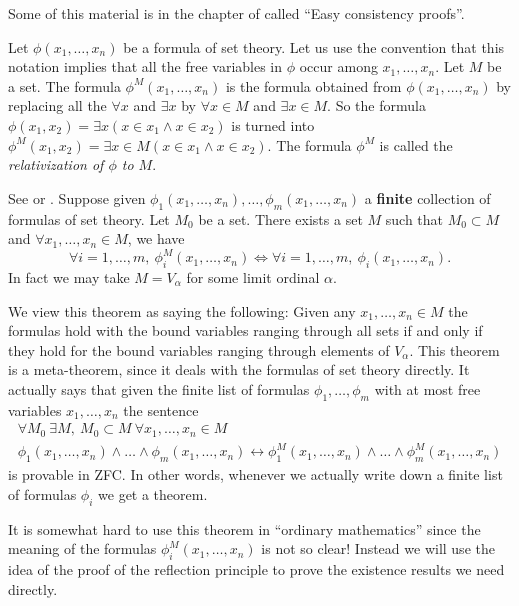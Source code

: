 \noindent
Some of this material is in the chapter of \cite{Kunen} called
``Easy consistency proofs''.

\medskip\noindent
Let $\phi(x_1,\ldots,x_n)$ be a formula of set theory.
Let us use the convention that this notation implies that
all the free variables in $\phi$ occur among $x_1, \ldots, x_n$.
Let $M$ be a set.
The formula $\phi^M(x_1, \ldots, x_n)$ is the
formula obtained from $\phi(x_1, \ldots, x_n)$ by replacing all the
$\forall x$ and $\exists x$ by $\forall x\in M$ and $\exists x\in M$.
So the formula
$\phi(x_1,x_2) = \exists x (x\in x_1 \wedge x\in x_2)$
is turned  into
$\phi^M(x_1,x_2) = \exists x \in M (x\in x_1 \wedge x\in x_2)$.
The formula $\phi^M$ is called the {\it relativization of $\phi$
to $M$}.

\begin{theorem}
\label{theorem-reflection-principle}
See \cite[Theorem 12.14]{Jech} or \cite[Theorem 7.4]{Kunen}.
Suppose given $\phi_1(x_1, \ldots, x_n), \ldots, \phi_m(x_1, \ldots, x_n)$
a {\bf finite} collection of
formulas of set theory. Let $M_0$ be a set.
There exists a set $M$ such that
$M_0 \subset M$ and
$\forall x_1, \ldots, x_n \in M$, we have
$$
\forall i = 1, \ldots, m,\  
\phi_i^{M}(x_1,\ldots,x_n)
\Leftrightarrow
\forall i = 1, \ldots, m,\  
\phi_i(x_1,\ldots,x_n).
$$
In fact we may take $M = V_\alpha$ for some limit ordinal $\alpha$.
\end{theorem}

\noindent
We view this theorem as saying the following: Given any
$x_1, \ldots, x_n \in M$ the formulas hold with the bound variables ranging
through all sets if and only if they hold for the bound variables ranging
through elements of $V_\alpha$. This theorem is a meta-theorem, since
it deals with the formulas of set theory directly.
It actually says that given the finite list of formulas
$\phi_1, \ldots, \phi_m$ with at most free variables $x_1, \ldots, x_n$
the sentence
$$
\begin{matrix}
\forall M_0\ \exists M,\ M_0 \subset M\ \forall x_1, \ldots, x_n \in M \\
\phi_1(x_1,\ldots,x_n) \wedge \ldots \wedge \phi_m(x_1,\ldots,x_n)
\leftrightarrow
\phi_1^M(x_1,\ldots,x_n) \wedge \ldots \wedge \phi_m^M(x_1,\ldots,x_n)
\end{matrix}
$$
is provable in ZFC. In other words, whenever we actually write down
a finite list of formulas $\phi_i$ we get a theorem.

\medskip\noindent
It is somewhat hard to use this theorem in ``ordinary mathematics''
since the meaning of the formulas $\phi_i^M(x_1, \ldots, x_n)$
is not so clear! Instead we will use the idea of the proof of the
reflection principle to prove the existence results we need directly.

